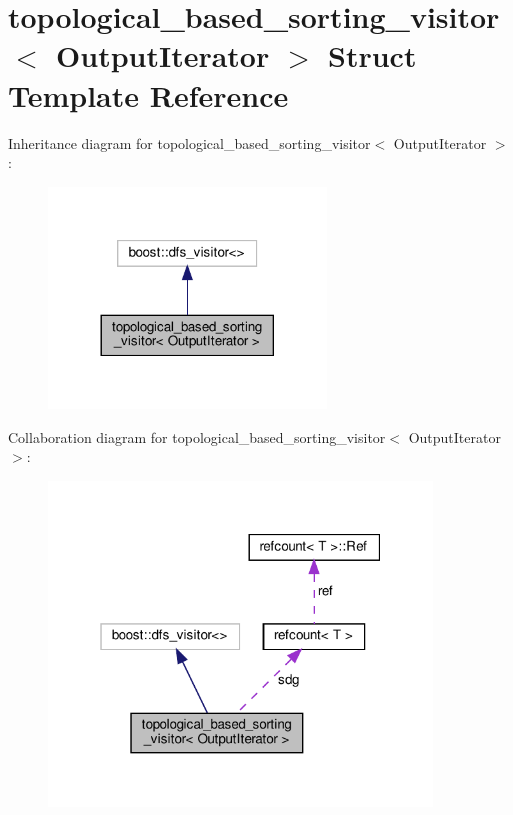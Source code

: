 \hypertarget{structtopological__based__sorting__visitor}{}\section{topological\+\_\+based\+\_\+sorting\+\_\+visitor$<$ Output\+Iterator $>$ Struct Template Reference}
\label{structtopological__based__sorting__visitor}


Inheritance diagram for topological\+\_\+based\+\_\+sorting\+\_\+visitor$<$ Output\+Iterator $>$\+:
\nopagebreak
\begin{figure}[H]
\begin{center}
\leavevmode
\includegraphics[width=209pt]{da/da0/structtopological__based__sorting__visitor__inherit__graph}
\end{center}
\end{figure}


Collaboration diagram for topological\+\_\+based\+\_\+sorting\+\_\+visitor$<$ Output\+Iterator $>$\+:
\nopagebreak
\begin{figure}[H]
\begin{center}
\leavevmode
\includegraphics[width=289pt]{de/d08/structtopological__based__sorting__visitor__coll__graph}
\end{center}
\end{figure}
